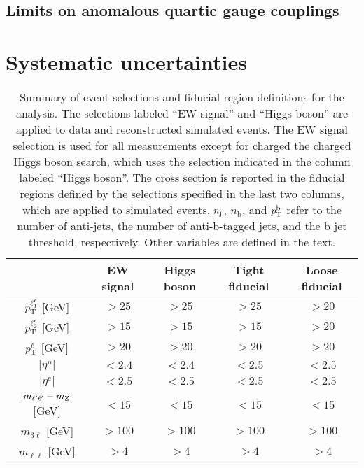 \subsection{Limits on anomalous quartic gauge couplings}
\section{Systematic uncertainties}

\begin{table}[!ht]
  \begin{center}
  \caption{Summary of event selections and fiducial region definitions for the analysis. 
    The selections labeled ``EW signal'' and ``Higgs boson'' are applied to data and reconstructed 
    simulated events.
    The EW signal selection is used for all measurements except for charged the charged Higgs boson search,
    which uses the selection indicated in the column labeled ``Higgs boson''.
    The \WZjj cross section is reported in the fiducial regions defined by the selections specified in 
    the last two columns, which are applied to simulated events.
    $n_{\mathrm{j}}$, $n_{\mathrm{b}}$, and $p_{\mathrm{T}}^{\mathrm{b}}$ refer to the number of
    anti-\kt jets, the number of anti-\kt b-tagged jets, and the b jet 
    \pt threshold, respectively. Other variables are defined in the text.
    }
  \begin{tabular}{c|c|c|c|c}
  \hline
                                    & EW signal & Higgs boson & Tight fiducial & Loose fiducial\\
    \hline\hline
    $  p_{\mathrm{T}}^{\ell'_{1}}   $ [GeV]    & $> 25$    & $> 25$        & $ > 25 $       & $ > 20 $ \\
    $  p_{\mathrm{T}}^{\ell'_{2}}   $ [GeV]    & $> 15$    & $> 15$        & $ > 15 $       & $ > 20 $ \\
    $  p_{\mathrm{T}}^{\ell}     $ [GeV]       & $> 20$    & $> 20$        & $ > 20 $       & $ > 20 $ \\
  $\left|\eta^{\mu}\right|   $      & $< 2.4$   & $< 2.4$       & $ < 2.5$       & $ < 2.5$ \\
    $\left|\eta^{\mathrm{e}}\right|$      & $< 2.5$   & $< 2.5$       & $ < 2.5$       & $ < 2.5$ \\
  $\left|m_{\ell'\ell'}-m_{\mathrm{Z}}\right|$ [GeV] & $ < 15 $ & $ < 15 $ & $ < 15 $ & $ < 15 $ \\
  $m_{3\ell}                $ [GeV] & $> 100$   & $> 100$       & $> 100$        & $> 100$    \\
  $m_{\ell\ell}           $ [GeV]   & $> 4$     & $> 4$         & $>4$           & $>4$    \\

\end{tabular}
\end{center}
\end{table}
